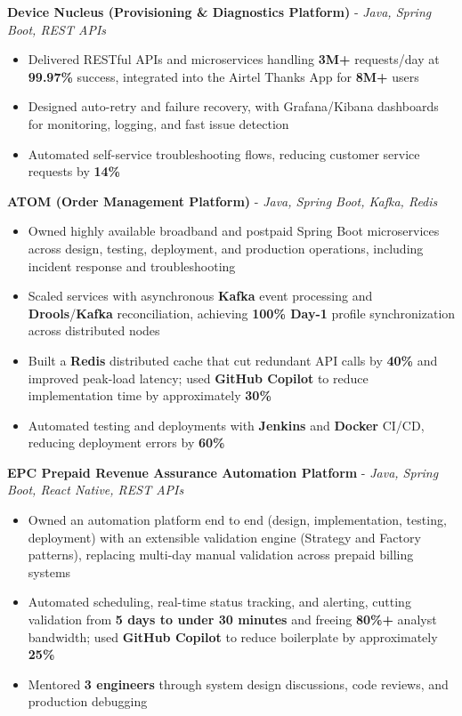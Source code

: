 \documentclass[letterpaper,10pt]{article}
\newcommand{\resumeItem}[1]{
  \item\small{{#1 \vspace{-2pt}}}
}
\newcommand{\resumeItemListStart}{\begin{itemize}[itemsep=0pt,topsep=2pt,parsep=0pt]}
\newcommand{\resumeItemListEnd}{\end{itemize}\vspace{-5pt}}
\begin{document}
      \vspace{2pt}
      \textbf{\small Device Nucleus (Provisioning \& Diagnostics Platform)} - \textit{\small Java, Spring Boot, REST APIs} \\
      \vspace{-2pt}
      \resumeItemListStart
        \resumeItem{Delivered RESTful APIs and microservices handling \textbf{3M+} requests/day at \textbf{99.97\%} success, integrated into the Airtel Thanks App for \textbf{8M+} users}
        \resumeItem{Designed auto-retry and failure recovery, with Grafana/Kibana dashboards for monitoring, logging, and fast issue detection}
        \resumeItem{Automated self-service troubleshooting flows, reducing customer service requests by \textbf{14\%}}
      \resumeItemListEnd

      \vspace{2pt}
      \textbf{\small ATOM (Order Management Platform)} - \textit{\small Java, Spring Boot, Kafka, Redis} \\
      \vspace{-2pt}
      \resumeItemListStart
        \resumeItem{Owned highly available broadband and postpaid Spring Boot microservices across design, testing, deployment, and production operations, including incident response and troubleshooting}
        \resumeItem{Scaled services with asynchronous \textbf{Kafka} event processing and \textbf{Drools}/\textbf{Kafka} reconciliation, achieving \textbf{100\% Day-1} profile synchronization across distributed nodes}
        \resumeItem{Built a \textbf{Redis} distributed cache that cut redundant API calls by \textbf{40\%} and improved peak-load latency; used \textbf{GitHub Copilot} to reduce implementation time by approximately \textbf{30\%}}
        \resumeItem{Automated testing and deployments with \textbf{Jenkins} and \textbf{Docker} CI/CD, reducing deployment errors by \textbf{60\%}}
      \resumeItemListEnd

      \vspace{2pt}
      \textbf{\small EPC Prepaid Revenue Assurance Automation Platform} - \textit{\small Java, Spring Boot, React Native, REST APIs} \\
      \vspace{-2pt}
      \resumeItemListStart
        \resumeItem{Owned an automation platform end to end (design, implementation, testing, deployment) with an extensible validation engine (Strategy and Factory patterns), replacing multi-day manual validation across prepaid billing systems}
        \resumeItem{Automated scheduling, real-time status tracking, and alerting, cutting validation from \textbf{5 days to under 30 minutes} and freeing \textbf{80\%+} analyst bandwidth; used \textbf{GitHub Copilot} to reduce boilerplate by approximately \textbf{25\%}}
        \resumeItem{Mentored \textbf{3 engineers} through system design discussions, code reviews, and production debugging}
      \resumeItemListEnd
\end{document}
